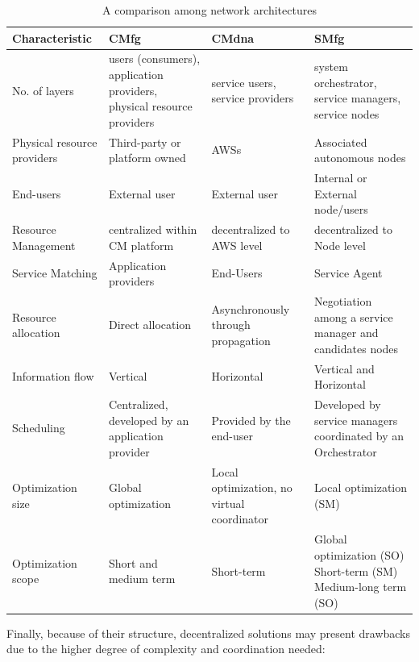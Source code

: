 \begin{table}
    \centering
    \begin{tabular}{|p{2.5cm}|p{2.5cm}|p{2.5cm}|p{2.5cm}|}
        \hline
        \textbf{Characteristic} & \textbf{CMfg} & \textbf{CMdna} & \textbf{SMfg} \\
        \hline
        No. of layers & users (consumers), application providers, physical resource providers & service users, service providers & system orchestrator, service managers, service nodes \\
        \hline
        Physical resource providers & Third-party or platform owned & AWSs & Associated autonomous nodes\\ 
        \hline
        End-users & External user & External user & Internal or External node/users\\
        \hline
        Resource Management & centralized within CM platform & decentralized to AWS level & decentralized to Node level\\ 
        \hline
        Service Matching & Application providers & End-Users & Service Agent\\
        \hline
        Resource allocation & Direct allocation & Asynchronously through propagation & Negotiation among a service manager and candidates nodes\\
        \hline
        Information flow & Vertical & Horizontal & Vertical and Horizontal\\
        \hline
        Scheduling & Centralized, developed by an application provider & Provided by the end-user & Developed by service managers coordinated by an Orchestrator\\
        \hline
        Optimization size & Global optimization & Local optimization, no virtual coordinator & Local optimization (SM)\\
        \hline
        Optimization scope & Short and medium term & Short-term & Global optimization (SO) Short-term (SM) Medium-long term (SO)\\
        \hline 
    \end{tabular}

    \caption{A comparison among network architectures}
    \label{tab:architectures-comparison}
\end{table}
Finally, because of their structure, decentralized solutions may present drawbacks due to the higher degree of complexity and coordination needed:
